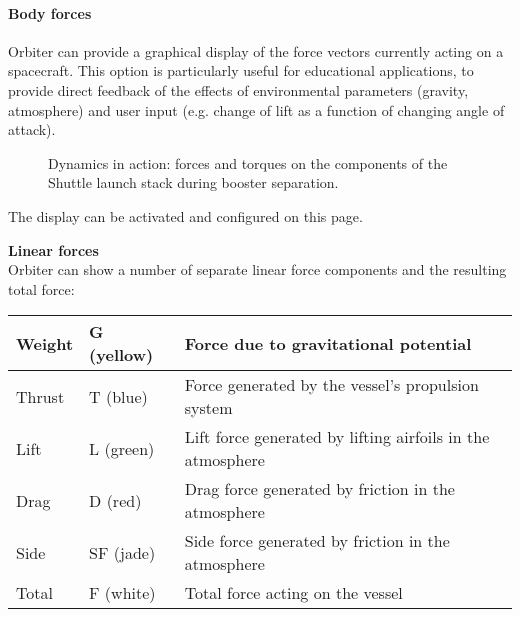 \documentclass[Orbiter User Manual.tex]{subfiles}
\begin{document}
\paragraph{Body forces}
Orbiter can provide a graphical display of the force vectors currently acting on a spacecraft. This option is particularly useful for educational applications, to provide direct feedback of the effects of environmental parameters (gravity, atmosphere) and user input (e.g. change of lift as a function of changing angle of attack).

\begin{figure}[H]
	\centering
	\caption{Dynamics in action: forces and torques on the components of the Shuttle launch stack during booster separation.}
\end{figure}

\noindent
The display can be activated and configured on this page.

\begin{figure}[H]
	\centering
\end{figure}

\noindent
\textbf{Linear forces}\\
Orbiter can show a number of separate linear force components and the resulting total force:

	\begin{longtable}{ |p{}|p{}|p{}| }
	\hline\rule{0pt}{2ex}
	Weight & G (yellow) & Force due to gravitational potential\\
	\hline\rule{0pt}{2ex}
	Thrust & T (blue) & Force generated by the vessel's propulsion system\\
	\hline\rule{0pt}{2ex}
	Lift & L (green) & Lift force generated by lifting airfoils in the atmosphere\\
	\hline\rule{0pt}{2ex}
	Drag & D (red) & Drag force generated by friction in the atmosphere\\
	\hline\rule{0pt}{2ex}
	Side & SF (jade) & Side force generated by friction in the atmosphere\\
	\hline\rule{0pt}{2ex}
	Total & F (white) & Total force acting on the vessel\\
	\hline
	\end{longtable}
\end{document}
